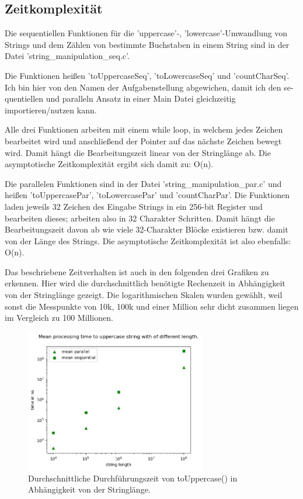 \documentclass[plainarticle,zihtitle,german,final,hyperref,utf8]{zihpub}
\begin{document}
\subsection{Zeitkomplexität}
Die se­quen­ti­ellen Funktionen für die 'uppercase'-, 'lowercase'-Umwandlung von Strings und dem Zählen von bestimmte Buchstaben in einem String sind in der Datei 'string\_manipulation\_seq.c'.

Die Funktionen heißen 'toUppercaseSeq', 'toLowercaseSeq' und 'countCharSeq'. Ich bin hier von den Namen der Aufgabenstellung abgewichen, damit ich den se­quen­ti­ellen und paralleln Ansatz in einer Main Datei gleichzeitig importieren/nutzen kann.

Alle drei Funktionen arbeiten mit einem while loop, in welchem jedes Zeichen bearbeitet wird und anschließend der Pointer auf das nächste Zeichen bewegt wird. Damit hängt die Bearbeitungszeit linear von der Stringlänge ab. Die asymptotische Zeitkomplexität ergibt sich damit zu: O(n).
\newline

Die parallelen Funktionen sind in der Datei 'string\_manipulation\_par.c' und heißen 'toUppercasePar', 'toLowercasePar' und 'countCharPar'.
Die Funktionen laden jeweils 32 Zeichen des Eingabe Strings in ein 256-bit Register und bearbeiten dieses; arbeiten also in 32 Charakter Schritten.
Damit hängt die Bearbeitungszeit davon ab wie viele 32-Charakter Blöcke existieren bzw. damit von der Länge des Strings. Die asymptotische Zeitkomplexität ist also ebenfalls: O(n).
\newline

Das beschriebene Zeitverhalten ist auch in den folgenden drei Grafiken zu erkennen.
Hier wird die durchschnittlich benötigte Rechenzeit in Abhängigkeit von der Stringlänge gezeigt.
Die logarithmischen Skalen wurden gewählt, weil sonst die Messpunkte von 10k, 100k und einer Million sehr dicht zusammen liegen im Vergleich zu 100 Millionen.


\begin{figure}[h]
	\begin{center}
		\includegraphics[width=0.7\textwidth]{images/complex_upper.png}
		\caption{Durchschnittliche Durchführungszeit von toUppercase() in Abhängigkeit von der Stringlänge.}
		\label{fig:mean_upper}
	\end{center}
\end{figure}
\end{document}
